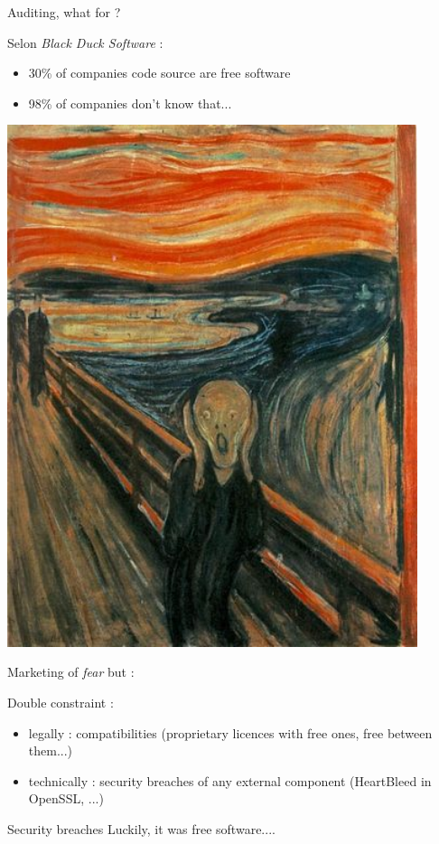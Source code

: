 \documentclass{beamer}
\begin{document}
\begin{frame}{Auditing, what for ?}

Selon \textit{Black Duck Software} :
\begin{itemize}
\item 30\% of companies code source are free software
\item 98\% of companies don't know that...

\end{itemize}

\begin{minipage}[c]{0.4\linewidth}
\includegraphics[width=0.9\textwidth]{images/The_Scream.jpg}\end{minipage}
\begin{minipage}[c]{0.55\linewidth}
Marketing of \textit{fear} but :

Double constraint :
\begin{itemize}
\item legally : compatibilities (proprietary licences with free ones, free between them...)
\item technically : security breaches of any external component (HeartBleed in OpenSSL, ...)
\end{itemize}
\end{minipage}

\begin{alertblock}{Security breaches}
Luckily, it was free software....
 \end{alertblock}
 
\end{frame}
\end{document}
